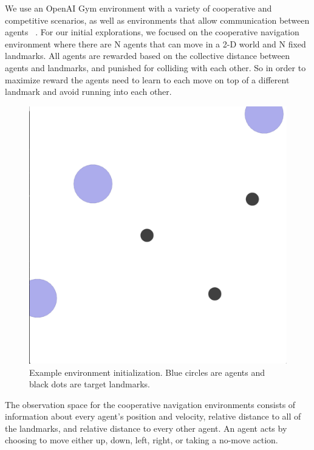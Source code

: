 \documentclass{article}
\begin{document}
We use an OpenAI Gym environment with a variety of cooperative and competitive scenarios, as well as environments that allow communication between agents ~\cite{openaigym}. For our initial explorations, we focused on the cooperative navigation environment where there are N agents that can move in a 2-D world and N fixed landmarks. All agents are rewarded based on the collective distance between agents and landmarks, and punished for colliding with each other. So in order to maximize reward the agents need to learn to each move on top of a different landmark and avoid running into each other.

\begin{figure}
\begin{center}
\includegraphics[scale=0.15]{env-image}
\end{center}
\caption{Example environment initialization. Blue circles are agents and black dots are target landmarks.}
\end{figure}

The observation space for the cooperative navigation environments consists of information about every agent's position and velocity, relative distance to all of the landmarks, and relative distance to every other agent. An agent acts by choosing to move either up, down, left, right, or taking a no-move action. 
\end{document}
